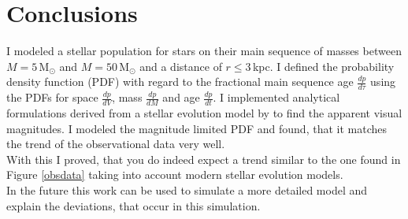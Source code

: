 \documentclass[a4paper,10pt]{article}
\begin{document}
 \newpage
 \section{Conclusions}
 I modeled a stellar population for stars on their main sequence of masses between $M=5\,$M$_\odot$ and $M=50\,$M$_\odot$ and a distance of 
 $r\le 3\,$kpc. I defined the probability density function (PDF) with regard to the fractional main sequence age $\frac{dp}{d\tau}$ using 
 the PDFs for space $\frac{dp}{dV}$, mass $\frac{dp}{dM}$ and age $\frac{dp}{dt}$. I implemented
 analytical formulations derived from a stellar evolution model by \citet{2000MNRAS.315..543H} to find the apparent visual magnitudes.
 I modeled the magnitude limited PDF and found, that it matches the trend of the observational data very well.\\
 With this I proved, that you do indeed expect a trend similar to the one found in Figure \ref{obsdata} taking into account modern stellar 
 evolution models.\\
 
 In the future this work can be used to simulate a more detailed model and explain the deviations, that occur in this simulation.
 
 
 
\end{document}
